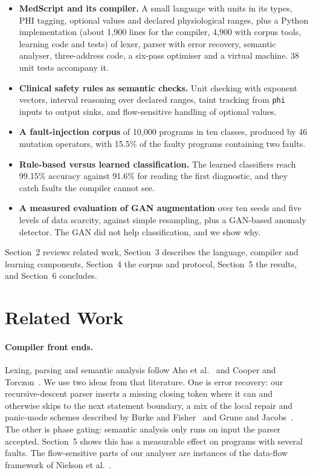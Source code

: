 \documentclass[12pt,a4paper]{article}
\newcommand{\code}[1]{\texttt{#1}}
\newcommand{\NProg}{10{,}000}
\newcommand{\DoubleShare}{15.5}
\newcommand{\RuleFirstAcc}{91.6}
\newcommand{\RFAcc}{99.15}
\begin{document}
\begin{itemize}
    \item \textbf{MedScript and its compiler.} A small language with units in its types, PHI tagging, optional values
    and declared physiological ranges, plus a Python implementation (about 1{,}900 lines for the compiler, 4{,}900
    with corpus tools, learning code and tests) of lexer, parser with error recovery, semantic analyser, three-address
    code, a six-pass optimiser and a virtual machine. 38 unit tests accompany it.
    \item \textbf{Clinical safety rules as semantic checks.} Unit checking with exponent vectors, interval reasoning over
    declared ranges, taint tracking from \code{phi} inputs to output sinks, and flow-sensitive handling of optional values.
    \item \textbf{A fault-injection corpus} of \NProg{} programs in ten classes, produced by 46 mutation operators, with
    \DoubleShare\% of the faulty programs containing two faults.
    \item \textbf{Rule-based versus learned classification.} The learned classifiers reach \RFAcc\% accuracy against
    \RuleFirstAcc\% for reading the first diagnostic, and they catch faults the compiler cannot see.
    \item \textbf{A measured evaluation of GAN augmentation} over ten seeds and five levels of data scarcity, against
    simple resampling, plus a GAN-based anomaly detector. The GAN did not help classification, and we show why.
\end{itemize}

Section~2 reviews related work, Section~3 describes the language, compiler and learning components, Section~4 the
corpus and protocol, Section~5 the results, and Section~6 concludes.

\section{Related Work}

\paragraph{Compiler front ends.} Lexing, parsing and semantic analysis follow Aho et al.~\cite{aho2006} and Cooper and
Torczon~\cite{cooper2007}. We use two ideas from that literature. One is error recovery: our recursive-descent parser
inserts a missing closing token where it can and otherwise skips to the next statement boundary, a mix of the local
repair and panic-mode schemes described by Burke and Fisher~\cite{burke1987} and Grune and Jacobs~\cite{grune2008}. The
other is phase gating: semantic analysis only runs on input the parser accepted. Section~5 shows this has a measurable
effect on programs with several faults. The flow-sensitive parts of our analyser are instances of the data-flow
framework of Nielson et al.~\cite{nielson1999}.
\end{document}
